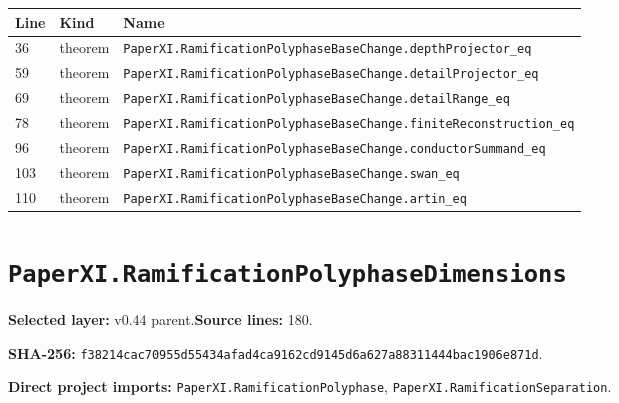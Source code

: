 \documentclass[10pt,oneside]{book}
\begin{document}
\begin{longtable}{@{}p{}p{}p{}@{}}\toprule Line&Kind&Name\\\midrule\endhead

36&theorem&\nolinkurl{PaperXI.RamificationPolyphaseBaseChange.depthProjector_eq}\\

59&theorem&\nolinkurl{PaperXI.RamificationPolyphaseBaseChange.detailProjector_eq}\\

69&theorem&\nolinkurl{PaperXI.RamificationPolyphaseBaseChange.detailRange_eq}\\

78&theorem&\nolinkurl{PaperXI.RamificationPolyphaseBaseChange.finiteReconstruction_eq}\\

96&theorem&\nolinkurl{PaperXI.RamificationPolyphaseBaseChange.conductorSummand_eq}\\

103&theorem&\nolinkurl{PaperXI.RamificationPolyphaseBaseChange.swan_eq}\\

110&theorem&\nolinkurl{PaperXI.RamificationPolyphaseBaseChange.artin_eq}\\

\bottomrule\end{longtable}

\section{\texorpdfstring{\nolinkurl{PaperXI.RamificationPolyphaseDimensions}}{PaperXI.RamificationPolyphaseDimensions}}\label{module:PaperXI.RamificationPolyphaseDimensions}

\textbf{Selected layer:} v0.44 parent.\quad\textbf{Source lines:} 180.\par\textbf{SHA-256:} {\scriptsize\nolinkurl{f38214cac70955d55434afad4ca9162cd9145d6a627a88311444bac1906e871d}}.


\textbf{Direct project imports:} \nolinkurl{PaperXI.RamificationPolyphase}, \nolinkurl{PaperXI.RamificationSeparation}.
\end{document}
